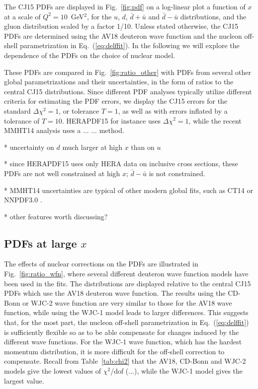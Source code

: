 \documentclass[aps,prd,amsmath,preprint]{revtex4}
\begin{document}
The CJ15 PDFs are displayed in Fig.~\ref{fig:pdf} on a log-linear
plot a function of $x$ at a scale of $Q^2=10$~GeV$^2$, for the
$u$, $d$, $\bar d + \bar u$ and $\bar d - \bar u$ distributions,
and the gluon distribution scaled by a factor 1/10.
Unless stated otherwise, the CJ15 PDFs are determined using the
AV18 deuteron wave function and the nucleon off-shell parametrization
in Eq.~(\ref{eq:delffit}).  In the following we will explore the
dependence of the PDFs on the choice of nuclear model.


These PDFs are compared in Fig.~\ref{fig:ratio_other} with PDFs from
several other global parametrizations and their uncertainties, in the
form of ratios to the central CJ15 distributions.  Since different
PDF analyses typically utilize different criteria for estimating
the PDF errors, we display the CJ15 errors for the standard
$\Delta\chi^2=1$, or tolerance $T=1$, as well as with errors
inflated by a tolerance of $T=10$.
HERAPDF15 for instance uses $\Delta\chi^2=1$, while the recent
MMHT14 analysis uses a ... ... method.


* uncertainty on $d$ much larger at high $x$ than on $u$


* since HERAPDF15 uses only HERA data on inclusive cross sections,
these PDFs are not well constrained at high $x$; $\bar d-\bar u$
is not constrained.


* MMHT14 uncertainties are typical of other modern global fits,
such as CT14 \cite{CT14} or NNPDF3.0 \cite{NNPDF3.0}.


* other features worth discussing?



\subsection{PDFs at large $x$}
\label{ssec:largex}

The effects of nuclear corrections on the PDFs are illustrated in
Fig.~\ref{fig:ratio_wfn}, where several different deuteron wave
function models have been used in the fits.  The distributions are
displayed relative to the central CJ15 PDFs which use the AV18
deuteron wave function.  The results using the CD-Bonn or WJC-2
wave function are very similar to those for the AV18 wave function,
while using the WJC-1 model leads to larger differences.
This suggests that, for the most part, the nucleon off-shell
parametrization in Eq.~(\ref{eq:delffit}) is sufficiently flexible
so as to be able compensate for changes induced by the different
wave functions.  For the WJC-1 wave function, which has the hardest
momentum distribution, it is more difficult for the off-shell
correction to compensate.
Recall from Table~\ref{tab:chi2} that the AV18, CD-Bonn and WJC-2
models give the lowest values of $\chi^2$/dof (...),
while the WJC-1 model gives the largest value.
\end{document}
